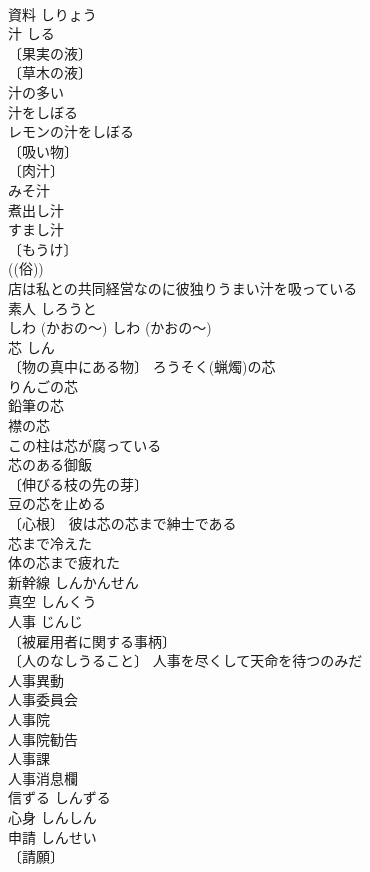 \documentclass[8pt]{extreport}
\begin{document}
\begin{CJK}{UTF8}{min}
\\	資料	しりょう	
\\	汁	しる	
\\	〔果実の液〕
\\	〔草木の液〕
\\	汁の多い 
\\	汁をしぼる 
\\	レモンの汁をしぼる 
\\	〔吸い物〕
\\	〔肉汁〕
\\	みそ汁 
\\	煮出し汁 
\\	すまし汁 
\\	〔もうけ〕
\\	((俗)) 
\\	店は私との共同経営なのに彼独りうまい汁を吸っている 
\\	素人	しろうと	
\\	しわ (かおの～)	しわ (かおの～)	
\\	芯	しん	
\\	〔物の真中にある物〕 ろうそく(蝋燭)の芯 
\\	りんごの芯 
\\	鉛筆の芯 
\\	襟の芯 
\\	この柱は芯が腐っている 
\\	芯のある御飯 
\\	〔伸びる枝の先の芽〕
\\	豆の芯を止める 
\\	〔心根〕 彼は芯の芯まで紳士である 
\\	芯まで冷えた 
\\	体の芯まで疲れた 
\\	新幹線	しんかんせん	
\\	真空	しんくう	
\\	人事	じんじ	
\\	〔被雇用者に関する事柄〕
\\	〔人のなしうること〕 人事を尽くして天命を待つのみだ 
\\	人事異動 
\\	人事委員会 
\\	人事院 
\\	人事院勧告 
\\	人事課 
\\	人事消息欄 
\\	信ずる	しんずる	
\\	心身	しんしん	
\\	申請	しんせい	
\\	〔請願〕

\end{CJK}
\end{document}
